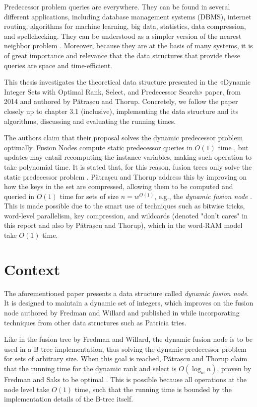 Predecessor problem queries are everywhere. They can be found in several different applications, including database management systems (DBMS), internet routing, algorithms for machine learning, big data, statistics, data compression, and spellchecking. They can be understood as a simpler version of the nearest neighbor problem \cite{bille2020massive}. Moreover, because they are at the basis of many systems, it is of great importance and relevance that the data structures that provide these queries are space and time-efficient.

This thesis investigates the theoretical data structure presented in the «Dynamic Integer Sets with Optimal Rank, Select, and Predecessor Search» paper, from 2014 and authored by Pătrașcu and Thorup. Concretely, we follow the paper closely up to chapter 3.1 (inclusive), implementing the data structure and its algorithms, discussing and evaluating the running times.

The authors claim that their proposal solves the dynamic predecessor problem optimally.
Fusion Nodes compute static predecessor queries in $O(1)$ time \cite{fredman1993surpassing}, but updates may entail recomputing the instance variables, making such operation to take polynomial time.
It is stated that, for this reason, fusion trees only solve the static predecessor problem \cite{nelsonjelanilec2}.
Pătrașcu and Thorup address this by improving on how the keys in the set are compressed, allowing them to be computed and queried in $O(1)$ time for sets of size $n = w^{O(1)}$, e.g., the \textit{dynamic fusion node} \cite{patrascu2014dynamic}.
This is made possible due to the smart use of techniques such as bitwise tricks, word-level parallelism, key compression, and wildcards (denoted "don't cares" in this report and also by Pătrașcu and Thorup), which in the word-RAM model take $O(1)$ time.

\section{Context}

The aforementioned paper presents a data structure called \textit{dynamic fusion node}. It is designed to maintain a dynamic set of integers, which improves on the fusion node authored by Fredman and Willard and published in \cite{fredman1993surpassing} while incorporating techniques from other data structures such as Patricia tries.

Like in the fusion tree by Fredman and Willard, the dynamic fusion node is to be used in a B-tree implementation, thus solving the dynamic predecessor problem for sets of arbitrary size. When this goal is reached, Pătrașcu and Thorup claim that the running time for the dynamic rank and select is $O(\log_w n)$, proven by Fredman and Saks to be optimal \cite{fredman1989cell}. This is possible because all operations at the node level take $O(1)$ time, such that the running time is bounded by the implementation details of the B-tree itself.

